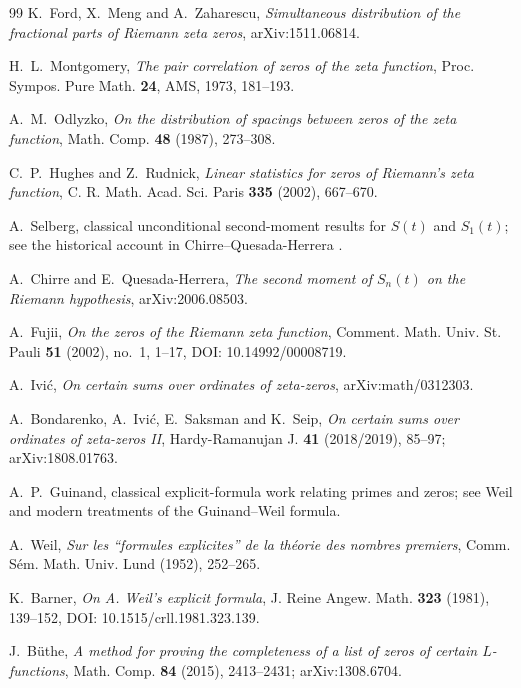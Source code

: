 \documentclass[11pt]{amsart}
\numberwithin{equation}{section}
\theoremstyle{definition}
\theoremstyle{remark}
\begin{document}
\begin{thebibliography}{99}
K.~Ford, X.~Meng and A.~Zaharescu,
\emph{Simultaneous distribution of the fractional parts of Riemann zeta zeros},
arXiv:1511.06814.

H.~L.~Montgomery,
\emph{The pair correlation of zeros of the zeta function},
Proc. Sympos. Pure Math. \textbf{24}, AMS, 1973, 181--193.

A.~M.~Odlyzko,
\emph{On the distribution of spacings between zeros of the zeta function},
Math. Comp. \textbf{48} (1987), 273--308.

C.~P.~Hughes and Z.~Rudnick,
\emph{Linear statistics for zeros of Riemann's zeta function},
C. R. Math. Acad. Sci. Paris \textbf{335} (2002), 667--670.

A.~Selberg,
classical unconditional second-moment results for $S(t)$ and $S_1(t)$;
see the historical account in Chirre--Quesada-Herrera \cite{ChirreQuesada2020}.

A.~Chirre and E.~Quesada-Herrera,
\emph{The second moment of $S_n(t)$ on the Riemann hypothesis},
arXiv:2006.08503.

A.~Fujii,
\emph{On the zeros of the Riemann zeta function},
Comment. Math. Univ. St. Pauli \textbf{51} (2002), no.~1, 1--17,
DOI: 10.14992/00008719.

A.~Ivić,
\emph{On certain sums over ordinates of zeta-zeros},
arXiv:math/0312303.

A.~Bondarenko, A.~Ivić, E.~Saksman and K.~Seip,
\emph{On certain sums over ordinates of zeta-zeros II},
Hardy-Ramanujan J. \textbf{41} (2018/2019), 85--97;
arXiv:1808.01763.

A.~P.~Guinand,
classical explicit-formula work relating primes and zeros;
see Weil and modern treatments of the Guinand--Weil formula.

A.~Weil,
\emph{Sur les ``formules explicites'' de la théorie des nombres premiers},
Comm. Sém. Math. Univ. Lund (1952), 252--265.

K.~Barner,
\emph{On A. Weil's explicit formula},
J. Reine Angew. Math. \textbf{323} (1981), 139--152,
DOI: 10.1515/crll.1981.323.139.

J.~Büthe,
\emph{A method for proving the completeness of a list of zeros of certain $L$-functions},
Math. Comp. \textbf{84} (2015), 2413--2431; arXiv:1308.6704.


\end{thebibliography}
\end{document}
